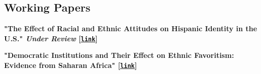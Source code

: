 \documentclass[10pt,letterpaper]{article}
\renewenvironment{itemize}{
  \begin{list}{}{
    \setlength{\leftmargin}{1.5em}
  }
}{
  \end{list}
}
\begin{document}
\subsection*{Working Papers}
\begin{itemize}

\item \textbf{"The Effect of Racial and Ethnic Attitudes on Hispanic Identity in the U.S." \emph{Under Review} [\href{https://hhadah.github.io/Attitudes-and-Identity/my_paper/Hadah-Attitudes.pdf}{\tt link}]}

\bigskip



\item \textbf{"Democratic Institutions and Their Effect on Ethnic Favoritism: Evidence from Saharan Africa" [\href{https://hhadah.github.io/ethnicfavoritism/my_paper/HussainHadahEthFav.pdf}{\tt link}]}

\bigskip



\end{itemize}
\end{document}
